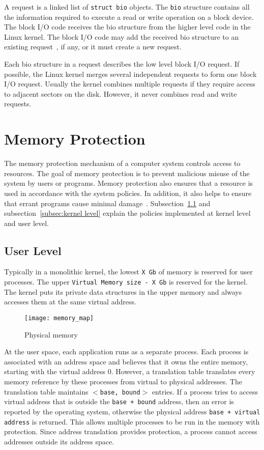 A request is a linked list of \texttt{struct bio} objects. The \texttt{bio} 
structure contains all the information required to execute a read or write
operation on a block device. The block I/O code receives the bio
structure from the higher level code in the Linux kernel. The
block I/O code may add the received bio structure to an existing
request~\cite{Corbet:2005:LDD:1209083}, if any, or it must create
a new request.

Each bio structure in a request describes the low level block I/O
request. If possible, the Linux kernel merges several independent
requests to form one block I/O request. Usually the kernel combines
multiple requests if they require access to adjacent sectors on
the disk. However, it never combines read and write requests.

\section{Memory Protection}

The memory protection mechanism of a computer system controls
access to resources. The goal of memory protection is to prevent
malicious misuse of the system by users or programs. Memory
protection also ensures that a resource is used in accordance
with the system policies. In addition, it also helps to
ensure that errant programs cause minimal damage~\cite{Galvin,
Graham:1971:PPP:1478873.1478928}. Subsection~\ref{subsec:user level}
and subsection~\ref{subsec:kernel level} explain the policies implemented
at kernel level and user level.

\subsection{User Level}
\label{subsec:user level}
%
%

Typically in a monolithic kernel, the lowest \texttt{X Gb} of memory is
reserved for user processes. The upper \texttt{Virtual Memory size - X Gb}
is reserved for the kernel. The kernel puts its private data structures
in the upper memory and always accesses them at the same virtual address.

\begin{figure}[!ht]
\centering
\texttt{[image: memory\_map]}
\caption{Physical memory}
\label{fig:memmap}
\end{figure}

At the user space, each application runs as a separate process. Each
process is associated with an address space and believes that it owns the
entire memory, starting with the virtual address 0. However, a translation
table translates every memory reference by these processes from virtual
to physical addresses. The translation table maintains \texttt{$<$base,
bound$>$} entries. If a process tries to access virtual address that
is outside the \texttt{base + bound} address, then an error is reported
by the operating system, otherwise the physical address \texttt{base +
virtual address} is returned. This allows multiple processes to be run in
the memory with protection. Since address translation provides protection,
a process cannot access addresses outside its address space.

